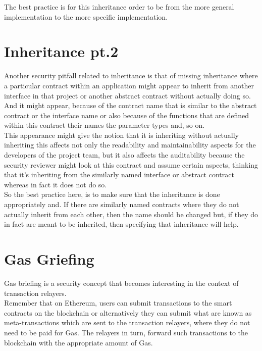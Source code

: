 The best practice is for this inheritance order to be from the more general implementation to the more specific implementation.

\section{Inheritance pt.2}

Another security pitfall related to inheritance is that of missing inheritance where a particular contract within an application might appear to inherit from another interface in that project or another abstract contract without actually doing so.\\

And it might appear, because of the contract name that is similar to the abstract contract or the interface name or also because of the functions that are defined within this contract their names the parameter types and, so on.\\

This appearance might give the notion that it is inheriting without actually inheriting this affects not only the readability and maintainability aspects for the developers of the project team, but it also affects the auditability because the security reviewer might look at this contract and assume certain aspects, thinking that it's inheriting from the similarly named interface or abstract contract whereas in fact it does not do so.\\

So the best practice here, is to make sure that the inheritance is done appropriately and. If there are similarly named contracts where they do not actually inherit from each other, then the name should be changed but, if they do in fact are meant to be inherited, then specifying that inheritance will help.

\section{Gas Griefing}

Gas briefing is a security concept that becomes interesting in the context of transaction relayers.\\

Remember that on Ethereum, users can submit transactions to the smart contracts on the blockchain or alternatively they can submit what are known as meta-transactions which are sent to the transaction relayers, where they do not need to be paid for Gas. The relayers in turn, forward such transactions to the blockchain with the appropriate amount of Gas. \\

